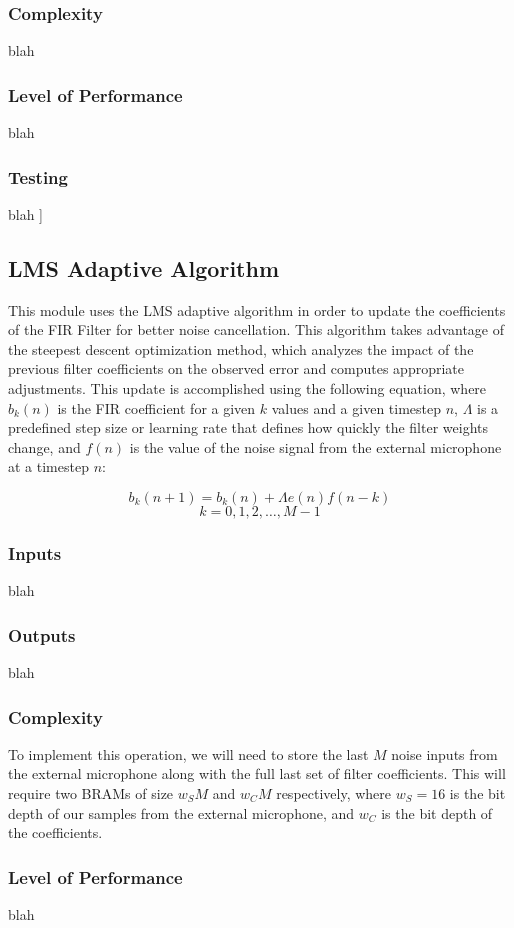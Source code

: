 \documentclass[12pt]{fpgairpods}
\begin{document}
\begin{multicols}{2}
\subsubsection{Complexity}
blah
\subsubsection{Level of Performance}
blah
\subsubsection{Testing}
blah
]
\subsection{LMS Adaptive Algorithm}
This module uses the LMS adaptive algorithm in order to update the coefficients of the FIR Filter for better noise cancellation. This algorithm takes advantage of the steepest descent optimization method, which analyzes the impact of the previous filter coefficients on the observed error and computes appropriate adjustments. This update is accomplished using the following equation, where $b_k(n)$ is the FIR coefficient for a given $k$ values and a given timestep $n$, $\Lambda$ is a predefined step size or learning rate that defines how quickly the filter weights change, and $f(n)$ is the value of the noise signal from the external microphone at a timestep $n$:

\[ b_k(n + 1) = b_k(n) + \Lambda e(n)f(n-k) \]
\[ k = 0, 1, 2,\ldots,  M-1 \]

\subsubsection{Inputs}
blah
\subsubsection{Outputs}
blah
\subsubsection{Complexity}
To implement this operation, we will need to store the last $M$ noise inputs from the external microphone along with the full last set of filter coefficients. This will require two BRAMs of size $w_S M$ and $w_C M$ respectively, where $w_S = 16$ is the bit depth of our samples from the external microphone, and $w_C$ is the bit depth of the coefficients.
\subsubsection{Level of Performance}
blah

\end{multicols}
\end{document}

